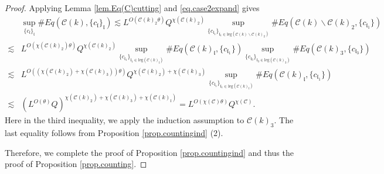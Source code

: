 \begin{proof}
Applying Lemma \ref{lem.Eq(C)cutting} and \eqref{eq.case2expand} gives
\begin{equation}\label{eq.case2expand'}
\begin{split}
    &\sup_{\{c_{\mathfrak{l}}\}_{\mathfrak{l}}}\#Eq(\mathcal{C}(k),\{c_{\mathfrak{l}}\}_{\mathfrak{l}})
    \lesssim  L^{O(\mathcal{C}(k)_2\theta)} Q^{\chi(\mathcal{C}(k)_2)}\sup_{\{c_{\mathfrak{l}_1}\}_{\mathfrak{l}_1\in \text{leg}(\mathcal{C}(k)\backslash\mathcal{C}(k)_2)} } \# Eq(\mathcal{C}(k)\backslash\mathcal{C}(k)_2,\{c_{\mathfrak{l}_1}\})
    \\
    \lesssim& L^{O(\chi(\mathcal{C}(k)_2)\theta)} Q^{\chi(\mathcal{C}(k)_2)}\sup_{\{c_{\mathfrak{l}_1}\}_{\mathfrak{l}_1\in \text{leg}(\mathcal{C}(k)_{\mathfrak{l}})} } \# Eq(\mathcal{C}(k)_{\mathfrak{l}},\{c_{\mathfrak{l}_1}\}) \sup_{\{c_{\mathfrak{l}_3}\}_{\mathfrak{l}_3\in \text{leg}(\mathcal{C}(k)_{3})} }\# Eq(\mathcal{C}(k)_{3}, \{c_{\mathfrak{l}_3}\})
    \\
    \lesssim& L^{O((\chi(\mathcal{C}(k)_2)+\chi(\mathcal{C}(k)_3))\theta)} Q^{\chi(\mathcal{C}(k)_2)+\chi(\mathcal{C}(k)_3)}\sup_{\{c_{\mathfrak{l}_1}\}_{\mathfrak{l}_1\in \text{leg}(\mathcal{C}(k)_{\mathfrak{l}})} } \# Eq(\mathcal{C}(k)_{\mathfrak{l}},\{c_{\mathfrak{l}_1}\}) 
    \\
    \lesssim& (L^{O(\theta)} Q)^{\chi(\mathcal{C}(k)_2)+\chi(\mathcal{C}(k)_3)+\chi(\mathcal{C}(k)_{\mathfrak{l}})}=L^{O(\chi(\mathcal{C})\theta)} Q^{\chi(\mathcal{C})}.
\end{split}
\end{equation}
Here in the third inequality, we apply the induction assumption to $\mathcal{C}(k)_3$. The last equality follows from Proposition \ref{prop.countingind} (2).

Therefore, we complete the proof of Proposition \ref{prop.countingind}
and thus the proof of Proposition \ref{prop.counting}.
\end{proof}






























